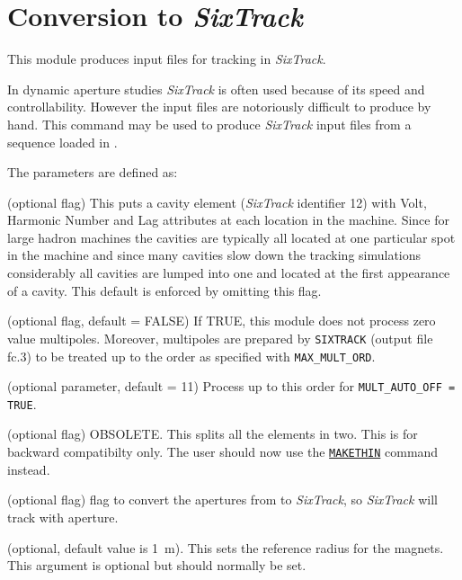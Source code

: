 

\chapter{Conversion to \textit{SixTrack}}
\label{chap:sixtrack}

This module produces input files for tracking in \textit{SixTrack}\cite{SixTrack_www}.

In dynamic aperture studies \textit{SixTrack}\cite{SixTrack} is often
used because of its  speed and controllability. However the input files
are notoriously difficult to produce by hand. This command may be used
to produce \textit{SixTrack} input files from a sequence loaded in \madx.

 
The parameters are defined as: 
\begin{madlist}
    (optional flag) This puts a cavity element
   (\textit{SixTrack} identifier 12) with Volt, Harmonic Number and Lag
   attributes at each location in the machine. Since for large hadron
   machines the cavities are typically all located at one particular
   spot in the machine and since many cavities slow down the tracking
   simulations considerably all cavities are lumped into one and located
   at the first appearance of a cavity. This default is enforced by
   omitting this flag.  

    (optional flag, default = FALSE) If
   TRUE, this module does not process zero value multipoles. 
   Moreover, multipoles are prepared by \texttt{SIXTRACK}
   (output file fc.3) to be treated up to the order as specified with
   {\tt MAX\_MULT\_ORD}.  

    (optional parameter, default = 11) Process up
   to this order for {\tt MULT\_AUTO\_OFF = TRUE}.  

    (optional flag) OBSOLETE. This splits all the
   elements in  two. This is for backward compatibilty only. The user
   should now use the \hyperref[chap:makethin]{\tt MAKETHIN} command
   instead.   

    (optional flag) flag to convert the apertures
   from \madx to \textit{SixTrack}, so \textit{SixTrack} will track
   with aperture.   

    (optional, default value is 1~m). This sets the
   reference  radius for the magnets. This argument is optional but
   should normally be set.  
\end{madlist}

